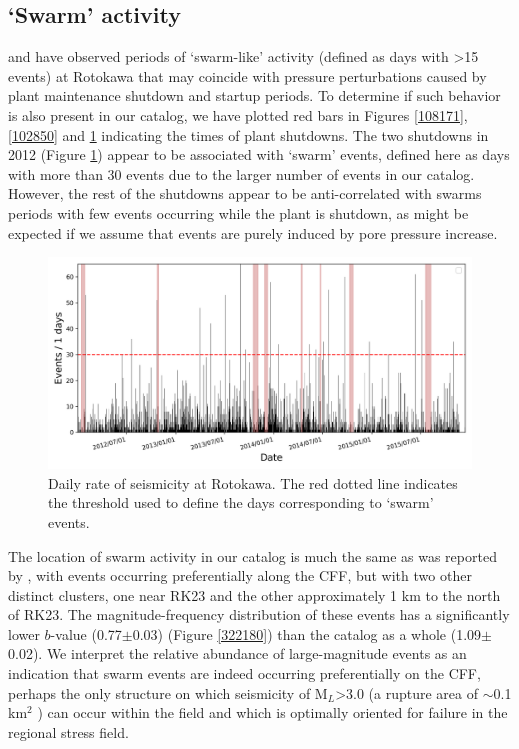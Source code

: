 \subsection{`Swarm' activity}
\citet{Sewell_2015WGC} and \citet{Sherburn_2015} have observed periods of `swarm-like' activity (defined as days with \textgreater15 events) at Rotokawa that may coincide with pressure perturbations caused by plant maintenance shutdown and startup periods. To determine if such behavior is also present in our catalog, we have plotted red bars in Figures \ref{108171}, \ref{102850} and \ref{754214} indicating the times of plant shutdowns. The two shutdowns in 2012 (Figure \ref{754214}) appear to be associated with `swarm' events, defined here as days with more than 30 events due to the larger number of events in our catalog. However, the rest of the shutdowns appear to be anti-correlated with swarms periods with few events occurring while the plant is shutdown, as might be expected if we assume that events are purely induced by pore pressure increase.

\begin{figure}[h!]
\begin{center}
\includegraphics[width=0.98\columnwidth]{Chapter_4_Rot/figures/Rot_dets_rate_swarms/Rot_dets_rate_swarms_thresh_30_w_shutdowns_3-16}
\caption[Rotokawa `swarm' dates]{{
Daily rate of seismicity at Rotokawa. The red dotted line indicates the
threshold used to define the days corresponding to `swarm' events.
{\label{754214}}%
}}
\end{center}
\end{figure}

The location of swarm activity in our catalog is much the same as was reported by \citet[][Figure 5]{Sewell_2015WGC}, with events occurring preferentially along the \acrshort{CFF}, but with two other distinct clusters, one near RK23 and the other approximately 1 km to the north of RK23. The magnitude-frequency distribution of these events has a significantly lower $b$-value (0.77$\pm$0.03) (Figure \ref{322180}) than the catalog as a whole (1.09$\pm$0.02). We interpret the relative abundance of large-magnitude events as an indication that swarm events are indeed occurring preferentially on the \acrshort{CFF}, perhaps the only structure on which seismicity of M$_L$\textgreater3.0 (a rupture area of $\sim$0.1 km$^2$ \citep{stein_2000}) can occur within the field and which is optimally oriented for failure in the regional stress field.


